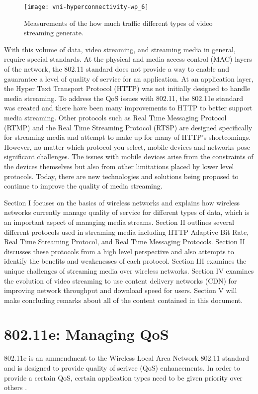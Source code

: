 \documentclass[12pt]{article}
\begin{document}
\begin{figure}[h]
  \begin{center}
    \texttt{[image: vni-hyperconnectivity-wp\_6]}
    \caption{Measurements of the how much traffic different types of video streaming generate.}
    \label{fig:videostreamingdist}
  \end{center}
\end{figure}

With this volume of data, video streaming, and streaming media in general, require special standards.  At the physical and media access control (MAC) layers of the network, the 802.11 standard does not provide a way to enable and gauarantee a level of quality of service for an application. At an application layer, the Hyper Text Transport Protocol (HTTP) was not initially designed to handle media streaming.  To address the QoS issues with 802.11, the 802.11e standard was created and there have been many improvements to HTTP to better support media streaming.  Other protocols such as Real Time Messaging Protocol (RTMP) and the Real Time Streaming Protocol (RTSP) are designed specifically for streaming media and attempt to make up for many of HTTP's shortcomings.  However, no matter which protocol you select, mobile devices and networks pose significant challenges.  The issues with mobile devices arise from the constraints of the devices themselves but also from other limitations placed by lower level protocols.  Today, there are new technologies and solutions being proposed to continue to improve the quality of media streaming.

Section I focuses on the basics of wireless networks and explains how wireless networks currently manage quality of service for different types of data, which is an important aspect of managing media streams.  Section II outlines several different protocols used in streaming media including HTTP Adaptive Bit Rate, Real Time Streaming Protocol, and Real Time Messaging Protocols.  Section II discusses these protocols from a high level perspective and also attempts to identify the benefits and weakenesses of each protocol.  Section III examines the unique challenges of streaming media over wireless networks.  Section IV examines the evolution of video streaming to use content delivery networks (CDN) for improving network throughput and download speed for users.  Section V will make concluding remarks about all of the content contained in this document.

\section{802.11e: Managing QoS}
802.11e is an ammendment to the Wireless Local Area Network 802.11 standard and is designed to provide quality of serivce (QoS) enhancements.  In order to provide a certain QoS, certain application types need to be given priority over others \cite{Thottan:2006:IEM:1234161.1234187}.
\end{document}
